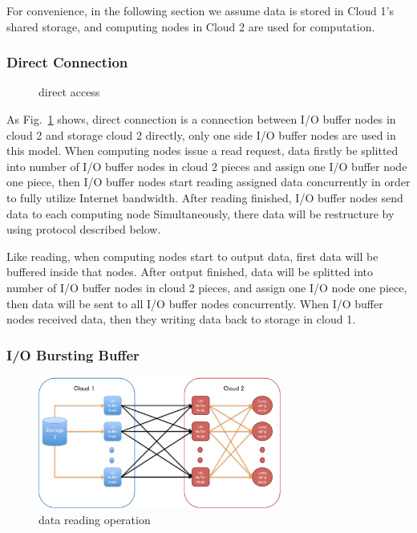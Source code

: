 \documentclass[JIP,draft]{ipsj}
\begin{document}

For convenience, in the following section we assume data is stored in Cloud 1's shared storage, and computing nodes in Cloud 2 are used for computation. 

\subsubsection{Direct Connection}

\begin{figure}[tb]
	\centering
	\caption{direct access}
	\label{direct access}
\end{figure}

As Fig.~\ref{direct access} shows, direct connection is a connection between I/O buffer nodes in cloud 2 and storage cloud 2 directly, only one side I/O buffer nodes are used in this model.
When computing nodes issue a read request, data firstly be splitted into number of I/O buffer nodes in cloud 2 pieces and assign one I/O buffer node one piece, then I/O buffer nodes start reading assigned data concurrently in order to fully utilize Internet bandwidth.
After reading finished, I/O buffer nodes send data to each computing node Simultaneously, there data will be restructure by using protocol described below.

Like reading, when computing nodes start to output data, first data will be buffered inside that nodes.
After output finished, data will be splitted into number of I/O buffer nodes in cloud 2 pieces, and assign one I/O node one piece, then data will be sent to all I/O buffer nodes concurrently.
When I/O buffer nodes received data, then they writing data back to storage in cloud 1.

\subsubsection{I/O Bursting Buffer}

\begin{figure}[tb]
	\centering
	\includegraphics[width=8cm]{reading}
	\caption{data reading operation}
	\label{reading}
\end{figure}
\end{document}
